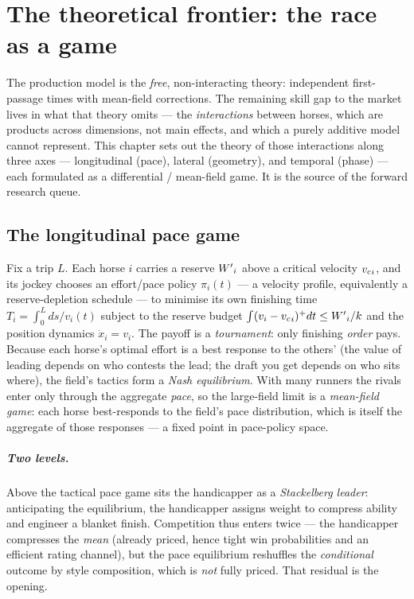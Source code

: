 \chapter{The theoretical frontier: the race as a game}
\label{ch:theory}

The production model is the \emph{free}, non-interacting theory: independent first-passage times
with mean-field corrections. The remaining skill gap to the market lives in what that theory omits
--- the \emph{interactions} between horses, which are products across dimensions, not main effects,
and which a purely additive model cannot represent. This chapter sets out the theory of those
interactions along three axes --- longitudinal (pace), lateral (geometry), and temporal (phase) ---
each formulated as a differential / mean-field game. It is the source of the forward research
queue.

\section{The longitudinal pace game}
\label{sec:pacegame}

Fix a trip $L$. Each horse $i$ carries a reserve ${W^{\prime}}_i$ above a critical velocity ${v_{c}}_i$, and its
jockey chooses an effort/pace policy $\pi_i(t)$ --- a velocity profile, equivalently a
reserve-depletion schedule --- to minimise its own finishing time
$T_i = \int_0^L ds/v_i(t)$ subject to the reserve budget $\int (v_i-{v_{c}}_i)^{+}dt \le {W^{\prime}}_i/k$ and
the position dynamics $\dot x_i = v_i$. The payoff is a \emph{tournament}: only finishing
\emph{order} pays. Because each horse's optimal effort is a best response to the others' (the value
of leading depends on who contests the lead; the draft you get depends on who sits where), the
field's tactics form a \emph{Nash equilibrium}. With many runners the rivals enter only through the
aggregate \emph{pace}, so the large-field limit is a \emph{mean-field game}: each horse best-responds
to the field's pace distribution, which is itself the aggregate of those responses --- a fixed point
in pace-policy space.

\paragraph{Two levels.} Above the tactical pace game sits the handicapper as a \emph{Stackelberg
leader}: anticipating the equilibrium, the handicapper assigns weight to compress ability and
engineer a blanket finish. Competition thus enters twice --- the handicapper compresses the
\emph{mean} (already priced, hence tight win probabilities and an efficient rating channel), but the
pace equilibrium reshuffles the \emph{conditional} outcome by style composition, which is
\emph{not} fully priced. That residual is the opening.

